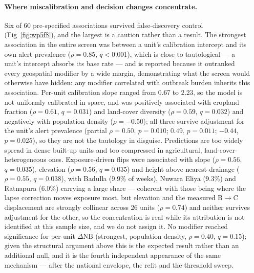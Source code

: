 \documentclass[11pt,a4paper]{article}
\begin{document}
\paragraph{Where miscalibration and decision changes concentrate.} Six of 60 pre-specified associations survived false-discovery control (Fig~\ref{fig:wp5f8}), and the largest is a caution rather than a result. The strongest association in the entire screen was between a unit's calibration intercept and its own alert prevalence ($\rho=0.85$, $q<0.001$), which is close to tautological --- a unit's intercept absorbs its base rate --- and is reported because it outranked every geospatial modifier by a wide margin, demonstrating what the screen would otherwise have hidden: any modifier correlated with outbreak burden inherits this association. Per-unit calibration slope ranged from 0.67 to 2.23, so the model is not uniformly calibrated in space, and was positively associated with cropland fraction ($\rho=0.61$, $q=0.031$) and land-cover diversity ($\rho=0.59$, $q=0.032$) and negatively with population density ($\rho=-0.50$); all three survive adjustment for the unit's alert prevalence (partial $\rho=0.50$, $p=0.010$; $0.49$, $p=0.011$; $-0.44$, $p=0.025$), so they are not the tautology in disguise. Predictions are too widely spread in dense built-up units and too compressed in agricultural, land-cover-heterogeneous ones. Exposure-driven flips were associated with slope ($\rho=0.56$, $q=0.035$), elevation ($\rho=0.56$, $q=0.035$) and height-above-nearest-drainage ($\rho=0.55$, $q=0.038$), with Badulla (9.9\% of weeks), Nuwara Eliya (9.3\%) and Ratnapura (6.0\%) carrying a large share --- coherent with those being where the lapse correction moves exposure most, but elevation and the measured B$\to$C displacement are strongly collinear across 26 units ($\rho=0.74$) and neither survives adjustment for the other, so the concentration is real while its attribution is not identified at this sample size, and we do not assign it. No modifier reached significance for per-unit $\Delta\mathrm{NB}$ (strongest, population density, $\rho=0.40$, $q=0.15$); given the structural argument above this is the expected result rather than an additional null, and it is the fourth independent appearance of the same mechanism --- after the national envelope, the refit and the threshold sweep.
\end{document}
